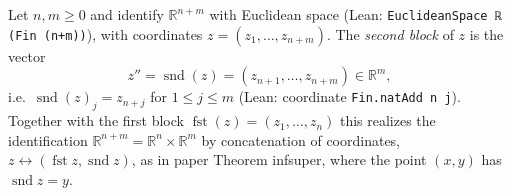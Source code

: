 \begin{definition}
Let $n,m\ge0$ and identify $\mathbb R^{n+m}$ with Euclidean space (Lean: \texttt{EuclideanSpace ℝ (Fin (n+m))}), with coordinates $z=(z_1,\dots,z_{n+m})$. The \emph{second block} of $z$ is the vector
\[
z''=\operatorname{snd}(z)=(z_{n+1},\dots,z_{n+m})\in\mathbb R^m ,
\]
i.e.\ $\operatorname{snd}(z)_j=z_{n+j}$ for $1\le j\le m$ (Lean: coordinate \texttt{Fin.natAdd n j}). Together with the first block $\operatorname{fst}(z)=(z_1,\dots,z_n)$ this realizes the identification $\mathbb R^{n+m}=\mathbb R^n\times\mathbb R^m$ by concatenation of coordinates, $z\leftrightarrow(\operatorname{fst}z,\operatorname{snd}z)$, as in paper Theorem infsuper, where the point $(x,y)$ has $\operatorname{snd}z=y$.
\end{definition}

